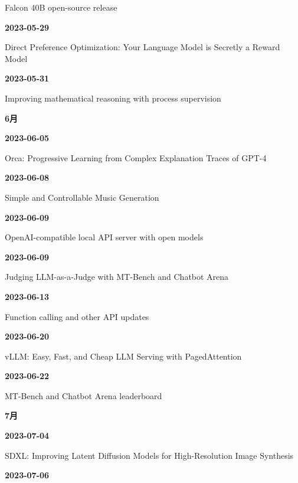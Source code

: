 {\raggedright Falcon 40B open-source release\,\cite{src-1fd43f93adcc}\par}
\smallskip
\noindent\textbf{2023-05-29}\par
{\raggedright Direct Preference Optimization: Your Language Model is Secretly a Reward Model\,\cite{src-21aef0026892}\par}
\smallskip
\noindent\textbf{2023-05-31}\par
{\raggedright Improving mathematical reasoning with process supervision\,\cite{src-b6a5fdb87e9f}\par}
\smallskip
\medskip
\noindent\textbf{6月}\par
\smallskip
\noindent\textbf{2023-06-05}\par
{\raggedright Orca: Progressive Learning from Complex Explanation Traces of GPT-4\,\cite{chron-f4302f6c8751}\par}
\smallskip
\noindent\textbf{2023-06-08}\par
{\raggedright Simple and Controllable Music Generation\,\cite{chron-1282e54fcdcd}\par}
\smallskip
\noindent\textbf{2023-06-09}\par
{\raggedright OpenAI-compatible local API server with open models\,\cite{chron-5893dba17816}\par}
\smallskip
\noindent\textbf{2023-06-09}\par
{\raggedright Judging LLM-as-a-Judge with MT-Bench and Chatbot Arena\,\cite{src-14f8acc117f1}\par}
\smallskip
\noindent\textbf{2023-06-13}\par
{\raggedright Function calling and other API updates\,\cite{src-6b76b870b4ae}\par}
\smallskip
\noindent\textbf{2023-06-20}\par
{\raggedright vLLM: Easy, Fast, and Cheap LLM Serving with PagedAttention\,\cite{src-fb804ac849e4}\par}
\smallskip
\noindent\textbf{2023-06-22}\par
{\raggedright MT-Bench and Chatbot Arena leaderboard\,\cite{src-1df7a91d31ec}\par}
\smallskip
\medskip
\noindent\textbf{7月}\par
\smallskip
\noindent\textbf{2023-07-04}\par
{\raggedright SDXL: Improving Latent Diffusion Models for High-Resolution Image Synthesis\,\cite{src-317afaba6510}\par}
\smallskip
\noindent\textbf{2023-07-06}\par
